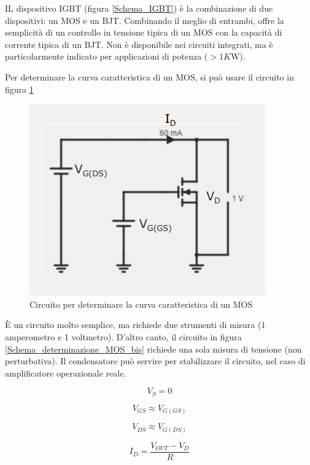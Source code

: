 \documentclass{article}
\begin{document}
IL dispositivo IGBT (figura \ref{Schema_IGBT}) è la combinazione di due dispositivi: un MOS e un BJT. Combinando il meglio di entrambi, offre la semplicità di un controllo in tensione tipica di un MOS con la capacità di corrente tipica di un BJT. Non è disponibile nei circuiti integrati, ma è particolarmente indicato per applicazioni di potenza ($> 1 K$W).

\vspace{3mm}

Per determinare la curva caratteristica di un MOS, si può usare il circuito in figura \ref{Schema_determinazione_MOS}

\begin{figure}[h]
  \centering
  \includegraphics[scale=0.7]{IM_determinazione_MOS}
  \caption{Circuito per determinare la curva caratteristica di un MOS}
  \label{Schema_determinazione_MOS}
\end{figure}

È un circuito molto semplice, ma richiede due strumenti di misura (1 amperometro e 1 voltmetro). D'altro canto, il circuito in figura \ref{Schema_determinazione_MOS_bis} richiede una sola misura di tensione (non perturbativa). Il condensatore può servire per stabilizzare il circuito, nel caso di amplificatore operazionale reale.

\[V_S = 0\]

\[V_{GS} \approx V_{G(GS)}\]

\[V_{DS} \approx V_{G(DS)}\]

\[I_D = \frac{V_{OUT} - V_D}{R}\]
\end{document}
